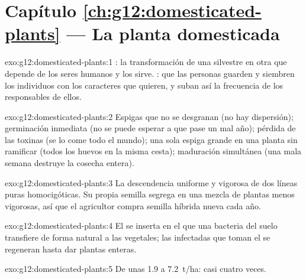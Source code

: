 \section*{Capítulo \ref{ch:g12:domesticated-plants} --- La planta domesticada}

\begin{solution}{exo:g12:domesticated-plants:1}
: la transformación de una  silvestre en otra que
depende de los seres humanos y los sirve. : que las
personas guarden y siembren los individuos con los caracteres que
quieren, y suban así la frecuencia de los  responsables de ellos.
\end{solution}

\begin{solution}{exo:g12:domesticated-plants:2}
Espigas que no se desgranan (no hay dispersión); germinación inmediata
(no se puede esperar a que pase un mal año); pérdida de las toxinas (se
lo come todo el mundo); una sola espiga grande en una planta sin
ramificar (todos los huevos en la misma cesta); maduración simultánea
(una mala semana destruye la cosecha entera).
\end{solution}

\begin{solution}{exo:g12:domesticated-plants:3}
La descendencia uniforme y vigorosa de dos líneas puras homocigóticas.
Su propia semilla segrega en una mezcla de plantas menos vigorosas, así
que el agricultor compra semilla híbrida nueva cada año.
\end{solution}

\begin{solution}{exo:g12:domesticated-plants:4}
El  se inserta en el  que una bacteria del suelo transfiere de
forma natural a las  vegetales; las  infectadas que toman
el  se regeneran hasta dar plantas enteras.
\end{solution}

\begin{solution}{exo:g12:domesticated-plants:5}
De unas \num{1.9} a \qty{7.2}{t/ha}: casi cuatro veces.
\end{solution}

